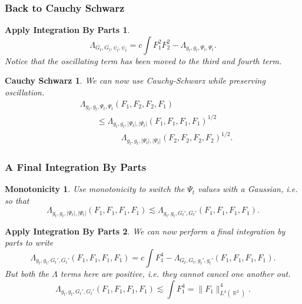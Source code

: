 \documentclass[usenames,dvipsnames,12pt]{beamer}
\DeclareMathOperator{\RR}{\mathbb{R}}
\newtheorem*{cauchyschwarz}{Cauchy Schwarz}
\newtheorem*{monotonicity}{Monotonicity}
\newtheorem*{ApplyIBP}{Apply Integration By Parts}
\begin{document}
\begin{frame}
    \frametitle{Back to Cauchy Schwarz}

    \begin{ApplyIBP}
    \[ \Lambda_{G_t, G_t, \psi_t, \psi_t} = c \int F_1^2 F_2^2 - \Lambda_{g_t,g_t, \Psi_t, \Psi_t}. \]
    Notice that the oscillating term has been moved to the third and fourth term.
    \end{ApplyIBP}

    \pause

    \begin{cauchyschwarz}
    We can now use Cauchy-Schwarz while preserving oscillation.
    \begin{align*}
        &\Lambda_{g_t,g_t, \Psi_t, \Psi_t}(F_1,F_2,F_2,F_1)\\
        &\quad\quad \leq \Lambda_{g_t,g_t,|\Psi_t|, |\Psi_t|}(F_1,F_1,F_1,F_1)^{1/2}\\
        &\quad\quad\quad\quad\quad \Lambda_{g_t,g_t,|\Psi_t|, |\Psi_t|}(F_2,F_2,F_2,F_2)^{1/2}.
    \end{align*}
    \end{cauchyschwarz}
\end{frame}





\begin{frame}
    \frametitle{A Final Integration By Parts}

    \begin{monotonicity}
    Use monotonicity to switch the $\Psi_t$ values with a Gaussian, i.e. so that
    \vspace{-0.7em}
    \[ \Lambda_{g_t,g_t,|\Psi_t|, |\Psi_t|}(F_1,F_1,F_1,F_1) \lesssim \Lambda_{g_t,g_t,G_t', G_t'}(F_1,F_1,F_1,F_1). \]
    \end{monotonicity}

    \pause

    \begin{ApplyIBP}

    We can now perform a final integration by parts to write
    \vspace{-0.5em}
    \[ \Lambda_{g_t,g_t,G_t', G_t'}(F_1,F_1,F_1,F_1) = c \int F_1^4 - \Lambda_{G_t,G_t,g_t',g_t'}(F_1,F_1,F_1,F_1). \]
    But both the $\Lambda$ terms here are \emph{positive}, i.e. they cannot cancel one another out.
    \vspace{-0.5em}
    \[ \Lambda_{g_t,g_t,G_t', G_t'}(F_1,F_1,F_1,F_1) \lesssim \int F_1^4 = \| F_1 \|_{L^4(\RR^2)}^4. \]
    \end{ApplyIBP}
\end{frame}
\end{document}
